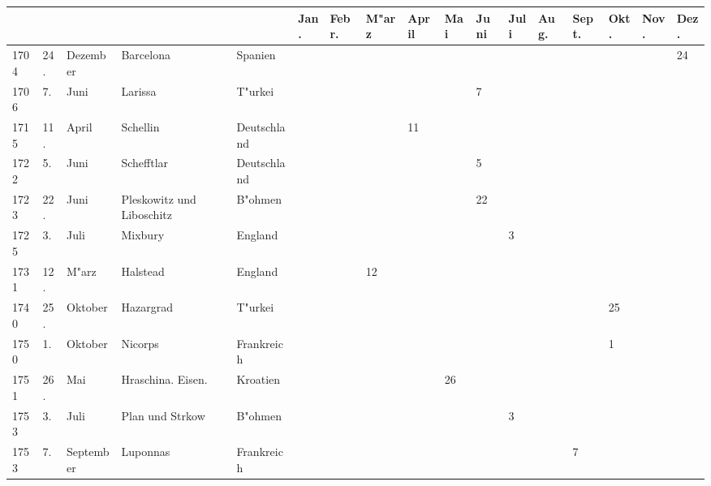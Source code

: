 \documentclass[a4paper, 8pt, oneside, polutonikogreek, german]{article}
\begin{document}
\section{}
\vspace*{\fill}
\clearpage
\begin{landscape}
\begin{table}[H]
    \footnotesize
    \swabfamily
    \centering
    \begin{longtable}{|p{5mm}|p{4mm}|p{13mm}|p{17mm}|p{17mm}|p{4mm}|p{6mm}|p{6mm}|p{6mm}|p{4mm}|p{5mm}|p{4mm}|p{5mm}|p{6mm}|p{5mm}|p{5mm}|p{5mm}|}
    \hline
         &  &  &  &  & Jan. & Febr. & M"arz & April & Mai & Juni & Juli & Aug. & Sept. & Okt. & Nov. & Dez. \\ \hline
        1704 & 24. & Dezember & Barcelona & Spanien & ~ & ~ & ~ & ~ & ~ & ~ & ~ & ~ & ~ & ~ & ~ & 24 \\ \hline
        1706 & 7. & Juni & Larissa & T"urkei & ~ & ~ & ~ & ~ & ~ & 7 & ~ & ~ & ~ & ~ & ~ & ~ \\ \hline
        1715 & 11. & April & Schellin & Deutschland & ~ & ~ & ~ & 11 & ~ & ~ & ~ & ~ & ~ & ~ & ~ & ~ \\ \hline
        1722 & 5. & Juni & Schefftlar & Deutschland & ~ & ~ & ~ & ~ & ~ & 5 & ~ & ~ & ~ & ~ & ~ & ~ \\ \hline
        1723 & 22. & Juni & Pleskowitz und Liboschitz & B"ohmen & ~ & ~ & ~ & ~ & ~ & 22 & ~ & ~ & ~ & ~ & ~ & ~ \\ \hline
        1725 & 3. & Juli & Mixbury & England & ~ & ~ & ~ & ~ & ~ & ~ & 3 & ~ & ~ & ~ & ~ & ~ \\ \hline
        1731 & 12. & M"arz & Halstead & England & ~ & ~ & 12 & ~ & ~ & ~ & ~ & ~ & ~ & ~ & ~ & ~ \\ \hline
        1740 & 25. & Oktober & Hazargrad & T"urkei & ~ & ~ & ~ & ~ & ~ & ~ & ~ & ~ & ~ & 25 & ~ & ~ \\ \hline
        1750 & 1. & Oktober & Nicorps & Frankreich & ~ & ~ & ~ & ~ & ~ & ~ & ~ & ~ & ~ & 1 & ~ & ~ \\ \hline
        1751 & 26. & Mai & Hraschina. Eisen. & Kroatien & ~ & ~ & ~ & ~ & 26 & ~ & ~ & ~ & ~ & ~ & ~ & ~ \\ \hline
        1753 & 3. & Juli & Plan und Strkow & B"ohmen & ~ & ~ & ~ & ~ & ~ & ~ & 3 & ~ & ~ & ~ & ~ & ~ \\ \hline
        1753 & 7. & September & Luponnas & Frankreich & ~ & ~ & ~ & ~ & ~ & ~ & ~ & ~ & 7 & ~ & ~ & ~ \\ \hline

\end{longtable}
\end{table}
\end{landscape}
\end{document}
